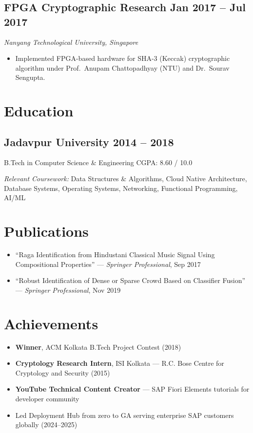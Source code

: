 \documentclass[11pt,a4paper]{article}
\begin{document}
\subsection{FPGA Cryptographic Research \hfill \normalfont\small Jan 2017 -- Jul 2017}
\textit{Nanyang Technological University, Singapore}
\begin{itemize}
  \item Implemented FPGA-based hardware for SHA-3 (Keccak) cryptographic algorithm under
        Prof.\ Anupam Chattopadhyay (NTU) and Dr.\ Sourav Sengupta.
\end{itemize}

\section{Education}

\subsection{Jadavpur University \hfill \normalfont\small 2014 -- 2018}
B.Tech in Computer Science \& Engineering \hfill CGPA: 8.60 / 10.0

\textit{Relevant Coursework:} Data Structures \& Algorithms, Cloud Native Architecture, Database Systems,
Operating Systems, Networking, Functional Programming, AI/ML

\section{Publications}

\begin{itemize}
  \item ``Raga Identification from Hindustani Classical Music Signal Using Compositional Properties''
        --- \textit{Springer Professional}, Sep 2017
  \item ``Robust Identification of Dense or Sparse Crowd Based on Classifier Fusion''
        --- \textit{Springer Professional}, Nov 2019
\end{itemize}

\section{Achievements}

\begin{itemize}
  \item \textbf{Winner}, ACM Kolkata B.Tech Project Contest (2018)
  \item \textbf{Cryptology Research Intern}, ISI Kolkata --- R.C. Bose Centre for Cryptology and Security (2015)
  \item \textbf{YouTube Technical Content Creator} --- SAP Fiori Elements tutorials for developer community
  \item Led Deployment Hub from zero to GA serving enterprise SAP customers globally (2024--2025)
\end{itemize}
\end{document}
